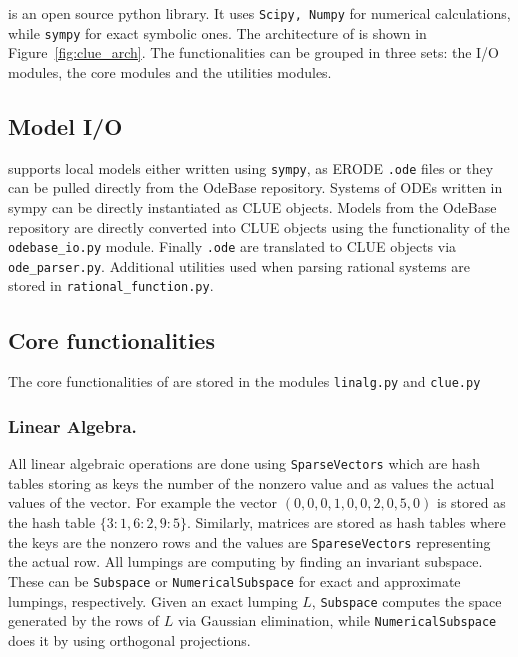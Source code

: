 \ToolName is an open source python library. 
It uses \texttt{Scipy, Numpy} for numerical calculations, while \texttt{sympy} for exact symbolic ones.
The architecture of \ToolName is shown in Figure~\ref{fig:clue_arch}.
The functionalities can be grouped in three sets: the I/O modules, the core modules and the utilities modules.

\subsection{Model I/O}
\ToolName supports local models either written using \texttt{sympy}, as ERODE \texttt{.ode} files or they can be pulled directly from the OdeBase repository. 
Systems of ODEs written in sympy can be directly instantiated as CLUE objects.
Models from the OdeBase repository are directly converted into CLUE objects using the functionality of the \texttt{odebase\_io.py} module.
Finally \texttt{.ode} are translated to CLUE objects via \texttt{ode\_parser.py}.
Additional utilities used when parsing rational systems are stored in \texttt{rational\_function.py}.

\subsection{Core functionalities}
The core functionalities of \ToolName are stored in the modules \texttt{linalg.py} and \texttt{clue.py}

\subsubsection{Linear Algebra.}
All linear algebraic operations are done using \texttt{SparseVectors} which are hash tables storing as keys the number of the nonzero value and as values the actual values of the vector. 
For example the vector $(0,0,0,1,0,0,2,0,5,0)$ is stored as the hash table $\{ 3:1, 6:2, 9:5\}$.
Similarly, matrices are stored as hash tables where the keys are the nonzero rows and the values are \texttt{SpareseVectors} representing the actual row.
All lumpings are computing by finding an invariant subspace. 
These can be \texttt{Subspace} or \texttt{NumericalSubspace} for exact and approximate lumpings, respectively.
Given an exact lumping $L$, \texttt{Subspace} computes the space generated by the rows of $L$ via Gaussian elimination, while \texttt{NumericalSubspace} does it by using orthogonal projections.

